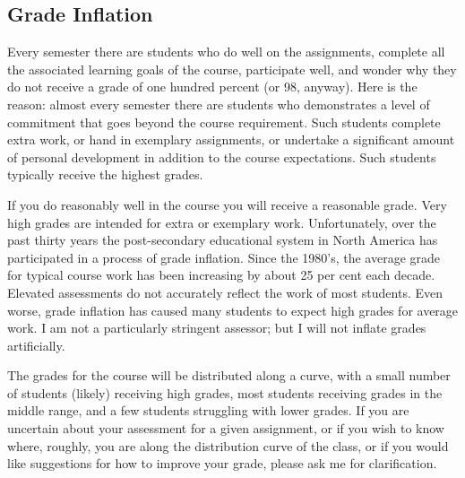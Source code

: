\documentclass{report}
\begin{document}
\subsection{Grade Inflation}
Every semester there are students who do well on the
assignments, complete all the associated learning goals of the course,
participate well, and wonder why they do not receive a grade of one
hundred percent (or 98, anyway). Here is the reason: almost every
semester there are students who demonstrates a level of commitment
that goes beyond the course requirement. Such students complete extra
work, or hand in exemplary assignments, or undertake a significant
amount of personal development in addition to the course expectations.
Such students typically receive the highest grades.

If you do reasonably well in the course you will receive a reasonable
grade. Very high grades are intended for extra or exemplary work.
Unfortunately, over the past thirty years the post-secondary
educational system in North America has participated in a process of
grade inflation. Since the 1980's, the average grade for typical
course work has been increasing by about 25 per cent each decade.
Elevated assessments do not accurately reflect the work of most
students. Even worse, grade inflation has caused many students to
expect high grades for average work. I am not a particularly stringent
assessor; but I will not inflate grades artificially.

The grades for the course will be distributed along a curve, with a
small number of students (likely) receiving high grades, most students
receiving grades in the middle range, and a few students struggling
with lower grades. If you are uncertain about your assessment for a
given assignment, or if you wish to know where, roughly, you are along
the distribution curve of the class, or if you would like suggestions
for how to improve your grade, please ask me for clarification.
\clearpage

\end{document}

